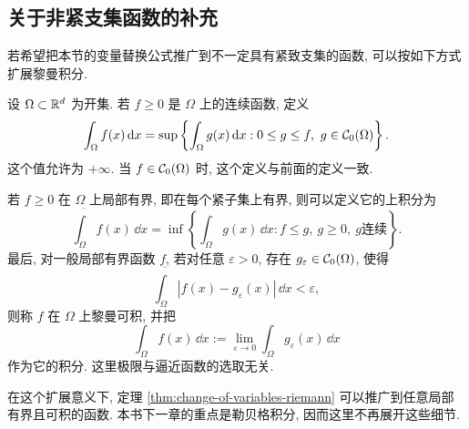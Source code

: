 \subsection{关于非紧支集函数的补充}

若希望把本节的变量替换公式推广到不一定具有紧致支集的函数, 可以按如下方式扩展黎曼积分.

设 \(\Omega\subset\mathbb{R}^d\) 为开集. 若 \(f\geq0\) 是 \(\Omega\) 上的连续函数, 定义
\[
\int_\Omega f(x)\,\dd x
=
\sup\left\{
\int_\Omega g(x)\,\dd x:
0\leq g\leq f,
\ g\in\mathcal{C}_0(\Omega)
\right\}.
\]
这个值允许为 \(+\infty\). 当 \(f\in\mathcal{C}_0(\Omega)\) 时, 这个定义与前面的定义一致.

若 \(f\geq0\) 在 \(\Omega\) 上局部有界, 即在每个紧子集上有界, 则可以定义它的上积分为
\[
\overline{\int_\Omega}f(x)\,\dd x
=
\inf\left\{
\int_\Omega g(x)\,\dd x:
f\leq g,
\ g\geq0,
\ g\text{连续}
\right\}.
\]
最后, 对一般局部有界函数 \(f\), 若对任意 \(\varepsilon>0\), 存在 \(g_\varepsilon\in\mathcal{C}_0(\Omega)\), 使得
\[
\overline{\int_\Omega}|f(x)-g_\varepsilon(x)|\,\dd x<\varepsilon,
\]
则称 \(f\) 在 \(\Omega\) 上黎曼可积, 并把
\[
\int_\Omega f(x)\,\dd x
:=
\lim_{\varepsilon\to0}
\int_\Omega g_\varepsilon(x)\,\dd x
\]
作为它的积分. 这里极限与逼近函数的选取无关.

在这个扩展意义下, 定理 \ref{thm:change-of-variables-riemann} 可以推广到任意局部有界且可积的函数. 本书下一章的重点是勒贝格积分, 因而这里不再展开这些细节.